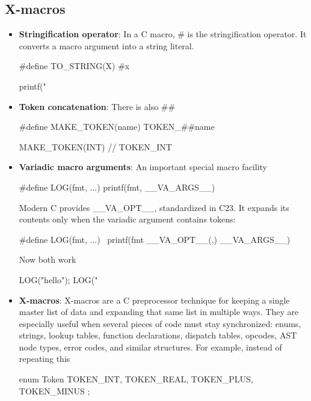 \documentclass{report}
\begin{document}
        \pagebreak 
        \subsection{X-macros}
        \begin{itemize}
            \item \textbf{Stringification operator}: In a C macro, \# is the stringification operator. It converts a macro argument into a string literal.
                \bigbreak \noindent 
                \begin{cppcode}
                #define TO_STRING(X) #x

                printf("%
                \end{cppcode}
            \item \textbf{Token concatenation}: There is also \#\#
                \bigbreak \noindent 
                \begin{cppcode}
                #define MAKE_TOKEN(name) TOKEN_##name

                MAKE_TOKEN(INT) // TOKEN_INT
                \end{cppcode}
            \item \textbf{Variadic macro arguments}: An important special macro facility
                \bigbreak \noindent 
                \begin{cppcode}
                #define LOG(fmt, ...) printf(fmt, __VA_ARGS__)
                \end{cppcode}
                \bigbreak \noindent 
                Modern C provides \_\_VA\_OPT\_\_, standardized in C23. It expands its contents only when the variadic argument contains tokens:
                \bigbreak \noindent 
                \begin{cppcode}
                    #define LOG(fmt, ...) \
                        printf(fmt __VA_OPT__(,) __VA_ARGS__)
                \end{cppcode}
                \bigbreak \noindent 
                Now both work
                \bigbreak \noindent 
                \begin{cppcode}
                    LOG("hello\n");
                    LOG("%
                \end{cppcode}
            \item \textbf{X-macros}: X-macros are a C preprocessor technique for keeping a single master list of data and expanding that same list in multiple ways. They are especially useful when several pieces of code must stay synchronized: enums, strings, lookup tables, function declarations, dispatch tables, opcodes, AST node types, error codes, and similar structures. 
                \bigbreak \noindent 
                For example, instead of repeating this
                \bigbreak \noindent 
                \begin{cppcode}
                    enum Token {
                        TOKEN_INT,
                        TOKEN_REAL,
                        TOKEN_PLUS,
                        TOKEN_MINUS
                    };


\end{cppcode}
\end{itemize}
\end{document}
